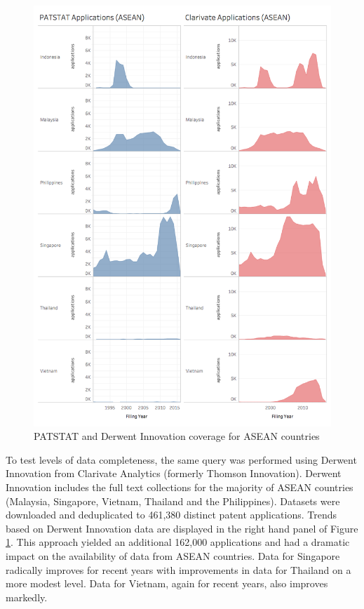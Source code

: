 \documentclass[]{book}
\theoremstyle{definition}
\theoremstyle{definition}
\theoremstyle{definition}
\theoremstyle{remark}
\begin{document}
\begin{figure}

{\centering \includegraphics[width=1\linewidth]{images/patstat_and_clarivate} 

}

\caption{PATSTAT and Derwent Innovation coverage for ASEAN countries}\label{fig:coverage}
\end{figure}

To test levels of data completeness, the same query was performed using
Derwent Innovation from Clarivate Analytics (formerly Thomson
Innovation). Derwent Innovation includes the full text collections for
the majority of ASEAN countries (Malaysia, Singapore, Vietnam, Thailand
and the Philippines). Datasets were downloaded and deduplicated to
461,380 distinct patent applications. Trends based on Derwent Innovation
data are displayed in the right hand panel of Figure \ref{fig:coverage}.
This approach yielded an additional 162,000 applications and had a
dramatic impact on the availability of data from ASEAN countries. Data
for Singapore radically improves for recent years with improvements in
data for Thailand on a more modest level. Data for Vietnam, again for
recent years, also improves markedly.
\end{document}
